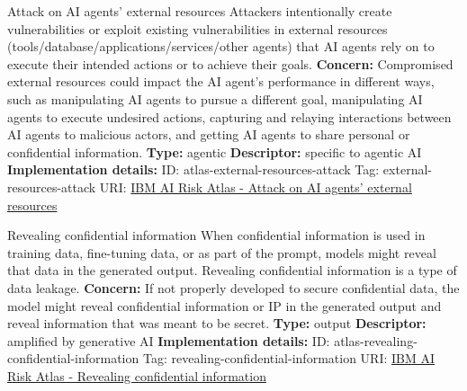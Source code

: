 \begin{definitionbox}{Attack on AI agents’ external resources}
Attackers intentionally create vulnerabilities or exploit existing vulnerabilities in external resources (tools/database/applications/services/other agents) that AI agents rely on to execute their intended actions or to achieve their goals. \newline\newline
\textbf{Concern: }Compromised external resources could impact the AI agent's performance in different ways, such as manipulating AI agents to pursue a different goal, manipulating AI agents to execute undesired actions, capturing and relaying interactions between AI agents to malicious actors, and getting AI agents to share personal or confidential information.\newline\newline
\textbf{Type: }agentic\newline
\textbf{Descriptor: }specific to agentic AI \newline\newline
\textbf{Implementation details: } \newline
ID: atlas-external-resources-attack \newline
Tag: external-resources-attack \newline
URI:  \href{https://www.ibm.com/docs/en/watsonx/saas?topic=SSYOK8/wsj/ai-risk-atlas/external-resources-attack.html}{IBM AI Risk Atlas - Attack on AI agents’ external resources}\newline
\end{definitionbox}
\begin{definitionbox}{Revealing confidential information}
When confidential information is used in training data, fine-tuning data, or as part of the prompt, models might reveal that data in the generated output. Revealing confidential information is a type of data leakage.\newline\newline
\textbf{Concern: }If not properly developed to secure confidential data, the model might reveal confidential information or IP in the generated output and reveal information that was meant to be secret.\newline\newline
\textbf{Type: }output\newline
\textbf{Descriptor: }amplified by generative AI \newline\newline
\textbf{Implementation details: } \newline
ID: atlas-revealing-confidential-information \newline
Tag: revealing-confidential-information \newline
URI:  \href{https://www.ibm.com/docs/en/watsonx/saas?topic=SSYOK8/wsj/ai-risk-atlas/revealing-confidential-information.html}{IBM AI Risk Atlas - Revealing confidential information}\newline
\end{definitionbox}
